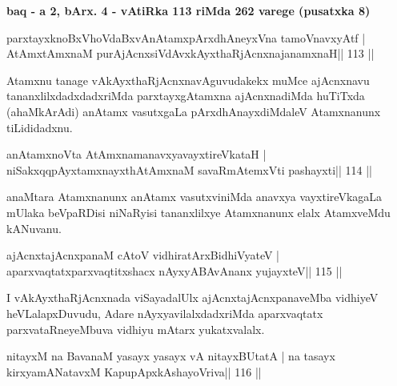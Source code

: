 \begin{center}
{\large\bf baq - a 2, bArx. 4 - vAtiRka 113 riMda 262 varege (pusatxka 8)}
\end{center}

\begin{shl}
parxtayxknoBxVhoVdaBxvAnAtamxpArxdhAneyxVna tamoVnavxyAtf |
AtAmx\s\s tAmxnaM purA\s jAcnxsiVdAvxkAyxthaRjAcnxnajanamxnaH\hfill || 113 ||
\end{shl}

\begin{artha}
Atamxnu tanage vAkAyxthaRjAcnxnavAguvudakekx muMce ajAcnxnavu tananxlilxdadxdadxriMda parxtayxgAtamxna ajAcnxnadiMda huTiTxda (ahaMkArAdi) anAtamx vasutxgaLa pArxdhAnayx\-diMdaleV Atamxnanunx tiLididadxnu.
\end{artha}

\begin{shl}
anAtamxnoV\s ta AtAmxnamanavxyavayxtireVkataH |
niSakxqqpAyx\s\s tamxnayxthA\s\s tAmxnaM savaRmAtemxVti pashayxti\hfill || 114 ||
\end{shl}

\begin{artha}
anaMtara Atamxnanunx anAtamx vasutxviniMda anavxya vayxtireVkagaLa mUlaka beVpaRDisi niNaRyisi tananxlilxye Atamxnanunx elalx AtamxveMdu kANuvanu.
\end{artha}

\begin{shl}
\footnotemark[1]ajAcnxtajAcnxpanaM cAtoV vidhiratArxBidhiVyateV |
\footnotemark[2]aparxvaqtatxparxvaqtitxshacx nAyxyABAvAnanx yujayxteV\hfill || 115 ||
\end{shl}

\begin{artha}
I vAkAyxthaRjAcnxnada viSayadalUlx ajAcnxtajAcnxpanaveMba vidhiyeV heVLalapxDu\-vudu, Adare nAyxyavilalxdadxriMda aparxvaqtatx parxvataRneyeMbuva vidhiyu mAtarx yukatxvalalx.
\end{artha}


\begin{shl}
nitayxM na BavanaM yasayx yasayx vA nitayxBUtatA |
na tasayx kirxyamANatavxM KapupApxkAshayoVriva\hfill || 116 ||
\end{shl}

